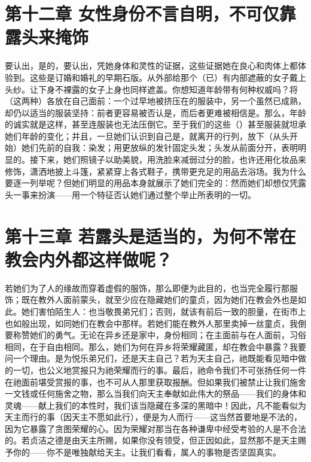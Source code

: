 \section{第十二章 女性身份不言自明，不可仅靠露头来掩饰}

要认出，是的，要认出，凭她身体和灵性的证据，这些证据她在良心和肉体上都体验到。这些是订婚和婚礼的早期石版。从外部给那个（已）有内部遮蔽的女子戴上头纱。让下身不裸露的女子上身也同样遮盖。你想知道年龄带有何种权威吗？将（这两种）各放在自己面前：一个过早地被挤压在的服装中，另一个虽然已成熟，却仍以适当的服装坚持：前者更容易被否认是，而后者更难被相信是。那么，年龄的诚实就是这样，甚至连服装也无法压倒它。至于我们的这些（）甚至服装就坦承她们年龄的变化；并且，一旦她们认识到自己是，就离开的行列，放下（从头开始）她们先前的自我：染发；用更放纵的发针固定头发；头发从前面分开，表明明显的。接下来，她们照镜子以助美貌，用洗脸来减弱过分的脸，也许还用化妆品来修饰，潇洒地披上斗篷，紧紧穿上各式鞋子，携带更充足的用品去浴场。我为什么要逐一列举呢？但她们明显的用品本身就展示了她们完全的：然而她们却想仅凭露头一事来扮演——用一个特征否认她们通过整个举止所表明的一切。\par


\section{第十三章 若露头是适当的，为何不常在教会内外都这样做呢？}

若她们为了人的缘故而穿着虚假的服饰，那么即便为此目的，也当完全履行那服饰；既在教外人面前蒙头，就至少应在隐藏她们的童贞，因为她们在教会外也是如此。她们害怕陌生人：也当敬畏弟兄们；否则，就该有前后一致的胆量，在街市上也如般出现，如同她们在教会中那样。若她们能在教外人那里卖掉一丝童贞，我倒要称赞她们的勇气。无论在异乡还是家中，身份相同；在主面前与在人面前，习俗相同，在于自由相同。那么，她们为何在异乡将荣耀藏匿，却在教会中暴露？我要问一个理由。是为悦乐弟兄们，还是天主自己？若为天主自己，祂既能看见暗中做的一切，也公义地赏报只为祂荣耀而行的事。最后，祂命令我们不可张扬任何一件在祂面前堪受赏报的事，也不可从人那里获取报酬。但如果我们被禁止让我们施舍一文钱或任何施舍之物，那么当我们向天主奉献如此伟大的祭品——我们的身体和灵魂——献上我们的本性时，我们该当隐藏在多深的黑暗中！因此，凡不能看似为天主而行的事（因天主不愿如此行），便是为人而行——这当然首要地是不法的，因为它暴露了贪图荣耀的心。因为荣耀对那当在各种谦卑中经受考验的人是不合法的。若贞洁之德是由天主所赐，如果你没有领受，但正因如此，显然那不是天主赐予你的——你不是唯独献给天主。让我们看看，属人的事物是否坚固真实。\par


